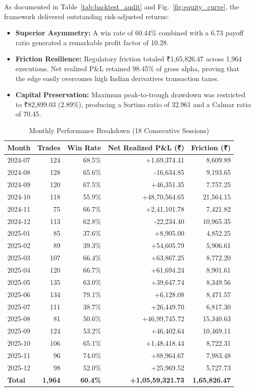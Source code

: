 \documentclass[journal]{IEEEtran}
\begin{document}
As documented in Table~\ref{tab:backtest_audit} and Fig.~\ref{fig:equity_curve}, the framework delivered outstanding risk-adjusted returns:
\begin{itemize}
    \item \textbf{Superior Asymmetry:} A win rate of 60.44\% combined with a 6.73 payoff ratio generated a remarkable profit factor of 10.28.
    \item \textbf{Friction Resilience:} Regulatory friction totaled ₹1,65,826.47 across 1{,}964 executions. Net realized P\&L retained 98.45\% of gross alpha, proving that the edge easily overcomes high Indian derivatives transaction taxes.
    \item \textbf{Capital Preservation:} Maximum peak-to-trough drawdown was restricted to ₹82,899.03 (2.89\%), producing a Sortino ratio of 32.961 and a Calmar ratio of 70.45.
\end{itemize}

\begin{table}[!t]
\renewcommand{\arraystretch}{1.12}
\caption{Monthly Performance Breakdown (18 Consecutive Sessions)}
\label{tab:monthly_perf}
\centering
\scriptsize
\begin{tabular}{lrrrr}
\toprule
\textbf{Month} & \textbf{Trades} & \textbf{Win Rate} & \textbf{Net Realized P\&L (₹)} & \textbf{Friction (₹)} \\
\midrule
2024-07 & 124 & 68.5\% & +1,69,374.41 & 8,609.89 \\
2024-08 & 128 & 65.6\% & -16,634.85  & 9,193.65 \\
2024-09 & 120 & 67.5\% & +46,351.35  & 7,757.25 \\
2024-10 & 118 & 55.9\% & +48,70,564.65 & 21,564.15 \\
2024-11 & 75  & 66.7\% & +2,41,101.78 & 7,421.82 \\
2024-12 & 113 & 62.8\% & -22,234.40  & 10,965.35 \\
2025-01 & 85  & 37.6\% & +8,905.00   & 4,852.25 \\
2025-02 & 89  & 39.3\% & +54,605.79  & 5,906.61 \\
2025-03 & 107 & 66.4\% & +63,867.25  & 8,772.20 \\
2025-04 & 120 & 66.7\% & +61,694.24  & 8,901.61 \\
2025-05 & 135 & 63.0\% & +39,647.74  & 8,349.56 \\
2025-06 & 134 & 79.1\% & +6,128.08   & 8,471.57 \\
2025-07 & 111 & 38.7\% & +26,449.70  & 6,817.30 \\
2025-08 & 81  & 50.6\% & +46,99,745.72 & 15,340.63 \\
2025-09 & 124 & 53.2\% & +46,402.64  & 10,469.11 \\
2025-10 & 106 & 65.1\% & +1,48,418.44 & 8,722.31 \\
2025-11 & 96  & 74.0\% & +88,964.67  & 7,983.48 \\
2025-12 & 98  & 52.0\% & +25,969.52  & 5,727.73 \\
\midrule
\textbf{Total} & \textbf{1{,}964} & \textbf{60.4\%} & \textbf{+1,05,59,321.73} & \textbf{1,65,826.47} \\
\bottomrule
\end{tabular}
\end{table}
\end{document}
